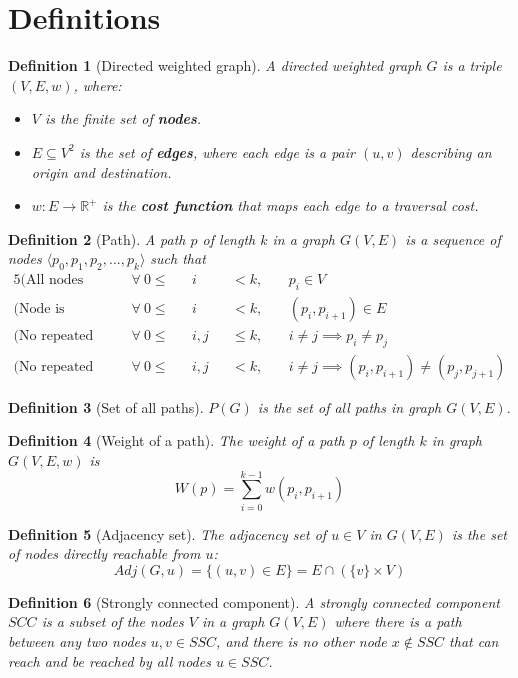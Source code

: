 \documentclass{report}[a4paper]
\newtheorem{definition}{Definition}[section]
\theoremstyle{remark}
\begin{document}
\section{Definitions}
\begin{definition}[Directed weighted graph]
    A directed weighted graph $G$ is a triple $(V, E, w)$, where:
    \begin{itemize}
        \item $V$ is the finite set of \textbf{nodes}.
        \item $E \subseteq V^2$ is the set of \textbf{edges}, where each edge is a pair $(u,v)$ describing an origin and destination.
        \item $w: E \rightarrow \mathbb{R}^+$ is the \textbf{cost function} that maps each edge to a traversal cost.
    \end{itemize}
\end{definition}
\begin{definition}[Path]
    A path $p$ of length $k$ in a graph $G(V,E)$ is a sequence of nodes $\langle p_0,p_1,p_2,...,p_k\rangle$ such that
    \begin{alignat*}{5}
        \text{(All nodes belong to the graph)}       ~~&\forall~0 \leq &&i   &&<    k,&&~p_i \in V \\
        \text{(Node is reachable from previous node)}~~&\forall~0 \leq &&i   &&<    k,&&~(p_i, p_{i+1}) \in E \\
        \text{(No repeated nodes)}                   ~~&\forall~0 \leq &&i,j &&\leq k,&&~i\neq j \implies p_i \neq p_j \\
        \text{(No repeated edges)}                   ~~&\forall~0 \leq &&i,j &&<    k,&&~i\neq j \implies (p_i,p_{i+1}) \neq (p_j, p_{j+1})
    \end{alignat*}
\end{definition}
\begin{definition}[Set of all paths]
    $P(G)$ is the set of all paths in graph $G(V,E)$.
\end{definition}
\begin{definition}[Weight of a path]
    The weight of a path $p$ of length $k$ in graph $G(V,E,w)$ is
    \begin{equation*}
        W(p) = \sum_{i=0}^{k-1}{w(p_i, p_{i+1})}
    \end{equation*}
\end{definition}
\begin{definition}[Adjacency set]
    The adjacency set of $u \in V$ in $G(V,E)$ is the set of nodes directly reachable from $u$:
    \begin{equation*}
        Adj(G, u) = \{(u, v) \in E\} = E \cap (\{v\}\times V)
    \end{equation*}
\end{definition}
\begin{definition}[Strongly connected component]
    A strongly connected component $SCC$ is a subset of the nodes $V$ in a graph $G(V,E)$ where there is a path between any two nodes $u, v \in SSC$, and there is no other node $x \not \in SSC$ that can reach and be reached by all nodes $u \in SSC$.
\end{definition}
\end{document}
